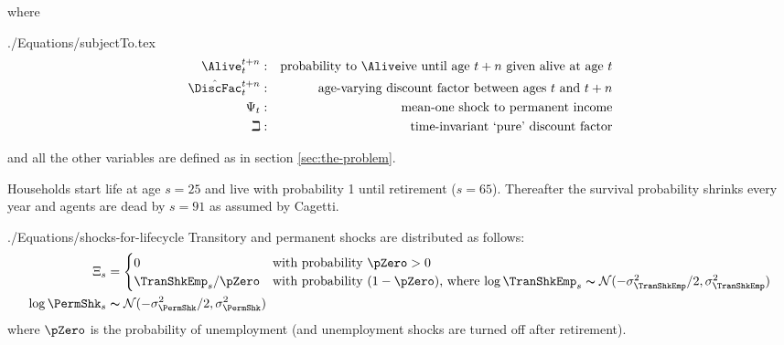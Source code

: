 \documentclass[titlepage, headings=optiontotocandhead]{\econtex}
\begin{document}

where
\begin{verbatimwrite}{./Equations/subjectTo.tex}
  \begin{equation*}\begin{gathered}\begin{aligned}
        \Alive _{t}^{t+n} &:&\text{probability to }\Alive\text{ive until age $t+n$ given alive at age $t$}
        \\      \hat{\DiscFac}_{t}^{t+n} &:&\text{age-varying discount factor between ages $t$ and $t+n$}
        \\     \Psi_{t} &:&\text{mean-one shock to permanent income}
        \\     \beth &:&\text{time-invariant `pure' discount factor}
      \end{aligned}\end{gathered}\end{equation*}
\end{verbatimwrite}
\unskip
and all the other variables are defined as in section \ref{sec:the-problem}.

Households start life at age $s=25$ and live with probability 1 until retirement
($s=65$). Thereafter the survival probability shrinks every year and
agents are dead by $s=91$ as assumed by Cagetti. %

\begin{verbatimwrite}{./Equations/shocks-for-lifecycle}
Transitory and permanent shocks are distributed as follows:
\begin{equation}\begin{gathered}\begin{aligned}
      \Xi_{s} & = 
      \begin{cases}
        0\phantom{/\pZero} & \text{with probability $\pZero>0$} \\
        \TranShkEmp_{s}/\pZero      & \text{with probability $(1-\pZero)$, where $\log \TranShkEmp_{s}\thicksim \mathcal{N}(-\sigma_{\TranShkEmp}^{2}/2,\sigma_{\TranShkEmp}^{2})$}\\
      \end{cases}\\
      \log \PermShk_{s} &\thicksim \mathcal{N}(-\sigma_{\PermShk}^{2}/2,\sigma_{\PermShk}^{2})
    \end{aligned}\end{gathered}\end{equation}
where $\pZero$ is the probability of unemployment (and unemployment shocks are turned off after retirement).
\end{verbatimwrite}

\end{document}
